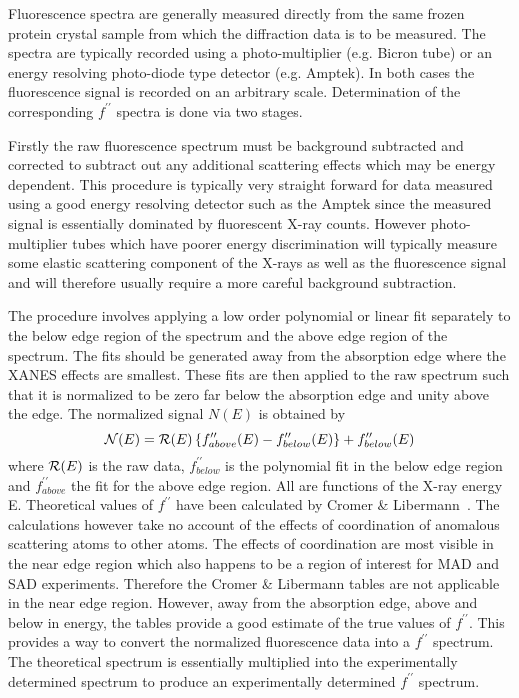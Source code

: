 \documentclass[a4paper]{article}
\begin{document}
Fluorescence spectra are generally measured directly from the same
frozen protein crystal sample from which the diffraction data is to be
measured.  The spectra are typically recorded using a photo-multiplier
(e.g. Bicron tube) or an energy resolving photo-diode type detector
(e.g. Amptek). In both cases the fluorescence signal is recorded on an
arbitrary scale.  Determination of the corresponding
$f^{\prime\prime}$ spectra is done via two stages.

Firstly the raw fluorescence spectrum must be background subtracted
and corrected to subtract out any additional scattering effects which
may be energy dependent. This procedure is typically very straight
forward for data measured using a good energy resolving detector such
as the Amptek since the measured signal is essentially dominated by
fluorescent X-ray counts.  However photo-multiplier tubes which have
poorer energy discrimination will typically measure some elastic scattering
component of the X-rays as well as the fluorescence signal and will
therefore usually require a more careful background subtraction. 

The procedure involves applying a low order polynomial or linear fit
separately to the below edge region of the spectrum and the above edge
region of the spectrum. The fits should be generated away from the
absorption edge where the XANES effects are smallest. These fits
are then applied to the raw spectrum such that it is
normalized to be zero far below the absorption edge and unity above
the edge. The normalized signal $N(E)$ is obtained by
\begin{equation}
{\cal N}(E) = {\cal R}(E) \left\{
              f^{\prime\prime}_{above}(E)-f^{\prime\prime}_{below}(E)
              \right \} + f^{\prime\prime}_{below}(E)
\end{equation}
where ${\cal R}(E)$ is the raw data, $f^{\prime\prime}_{below}$ is the
polynomial fit in the below edge region and $f^{\prime\prime}_{above}$
the fit for the above edge region. All are functions of the X-ray
energy E.  Theoretical values of $f^{\prime\prime}$ have been
calculated by Cromer \& Libermann~\cite{cromer70:_relat_x}. The
calculations however take no account of the effects of coordination of
anomalous scattering atoms to other atoms. The effects of coordination
are most visible in the near edge region which also happens to be a
region of interest for MAD and SAD experiments. Therefore the Cromer
\& Libermann tables are not applicable in the near edge
region. However, away from the absorption edge, above and below in
energy, the tables provide a good estimate of the true values of
$f^{\prime\prime}$. This provides a way to convert the normalized
fluorescence data into a $f^{\prime\prime}$ spectrum. The theoretical
spectrum is essentially multiplied into the experimentally determined
spectrum to produce an experimentally determined $f^{\prime\prime}$
spectrum.
\end{document}
